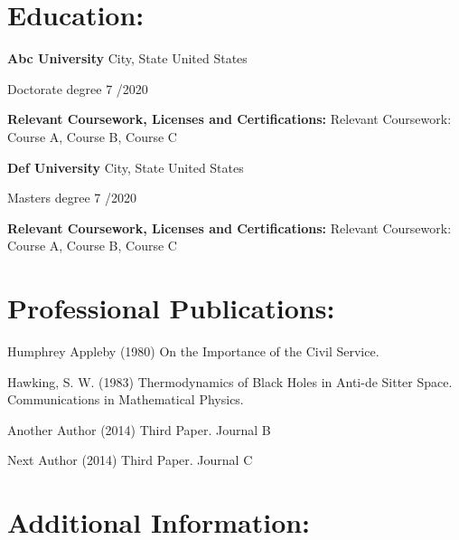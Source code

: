 \documentclass{usajobs}
\begin{document}
\noindent\rlap{\rule{\textwidth}{.5mm}}

\section{Education:}

\textbf{Abc University} City, State United States

Doctorate degree 7 /2020

\vspace{1em}

\textbf{Relevant Coursework, Licenses and Certifications:}
Relevant Coursework: Course A, Course B, Course C

\noindent\rlap{\rule{\textwidth}{.5mm}}

\textbf{Def University} City, State United States

Masters degree 7 /2020

\vspace{1em}

\textbf{Relevant Coursework, Licenses and Certifications:}
Relevant Coursework: Course A, Course B, Course C

\noindent\rlap{\rule{\textwidth}{.5mm}}

\section{Professional Publications:}

Humphrey Appleby (1980) On the Importance of the Civil Service.

\vspace{1em}

Hawking, S. W. (1983) Thermodynamics of Black Holes in Anti-de Sitter Space. Communications in Mathematical Physics.

\vspace{1em}

Another Author (2014) Third Paper. Journal B

\vspace{1em}

Next Author (2014) Third Paper. Journal C

\noindent\rlap{\rule{\textwidth}{.5mm}}

\section{Additional Information:}

\lipsum[2]
\end{document}

